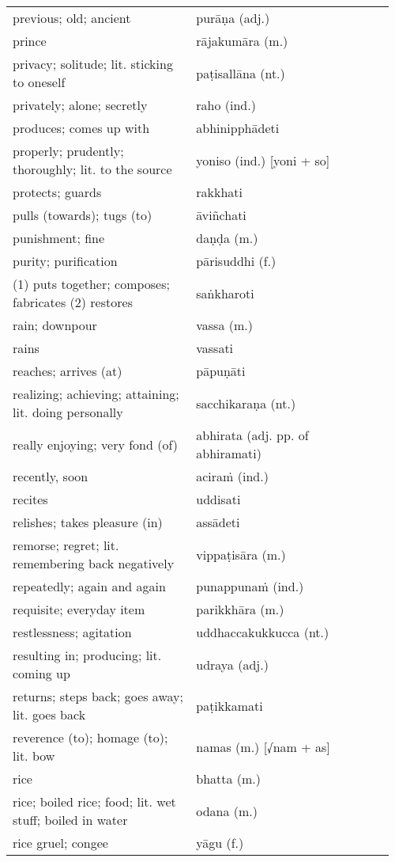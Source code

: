 \documentclass[a5paper]{memoir}
\begin{document}
\begin{longtable}{L{0.48\linewidth} L{0.48\linewidth} H}
previous; old; ancient & purāṇa (adj.) & \\
prince & rājakumāra (m.) & \\
privacy; solitude; lit. sticking to oneself & paṭisallāna (nt.) & \\
privately; alone; secretly & raho (ind.) & \\
produces; comes up with & abhinipphādeti & \\
properly; prudently; thoroughly; lit. to the source & yoniso (ind.) [yoni + so] & \\
protects; guards & rakkhati & \\
pulls (towards); tugs (to) & āviñchati & \\
punishment; fine & daṇḍa (m.) & \\
purity; purification & pārisuddhi (f.) & \\
(1) puts together; composes; fabricates (2) restores & saṅkharoti & \\
rain; downpour & vassa (m.) & \\
rains & vassati & \\
reaches; arrives (at) & pāpuṇāti & \\
realizing; achieving; attaining; lit. doing personally & sacchikaraṇa (nt.) & \\
really enjoying; very fond (of) & abhirata (adj. pp. of abhiramati) & \\
recently, soon & aciraṁ (ind.) & \\
recites & uddisati & \\
relishes; takes pleasure (in) & assādeti & \\
remorse; regret; lit. remembering back negatively & vippaṭisāra (m.) & \\
repeatedly; again and again & punappunaṁ (ind.) & \\
requisite; everyday item & parikkhāra (m.) & \\
restlessness; agitation & uddhaccakukkucca (nt.) & \\
resulting in; producing; lit. coming up & udraya (adj.) & \\
returns; steps back; goes away; lit. goes back & paṭikkamati & \\
reverence (to); homage (to); lit. bow & namas (m.) [√nam + as] & \\
rice & bhatta (m.) & \\
rice; boiled rice; food; lit. wet stuff; boiled in water & odana (m.) & \\
rice gruel; congee & yāgu (f.) & \\

\end{longtable}
\end{document}
